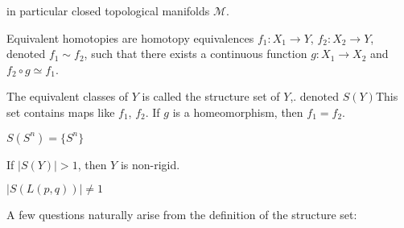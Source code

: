 \documentclass[crop=false,class=article,oneside]{standalone}
\begin{document}
        in particular closed topological
        manifolds $\mathcal{M}$.
        \begin{definition}
                Equivalent homotopies are homotopy equivalences
                $f_{1}:X_{1}\rightarrow Y$,
                $f_{2}:X_{2}\rightarrow Y$,
                denoted $f_{1}\sim{f_{2}}$, such that there
                exists a continuous function
                $g:X_{1}\rightarrow{X_{2}}$ and
                $f_{2}\circ{g}\simeq{f_{1}}$.
            \end{definition}
        The equivalent classes of $Y$ is called the
        structure set of $Y$,.
        denoted $S(Y)$This set contains maps
        like $f_{1}$, $f_{2}$.
        If $g$ is a homeomorphism, then $f_{1}=f_{2}$.
        \begin{example}
                $S(S^{n})=\{S^{n}\}$
            \end{example}
        If $|S(Y)|>1$, then $Y$ is non-rigid.
        \begin{example}
                $|S(L(p,q))|\ne{1}$
            \end{example}
        A few questions naturally arise from the
        definition of the structure set:
\end{document}
